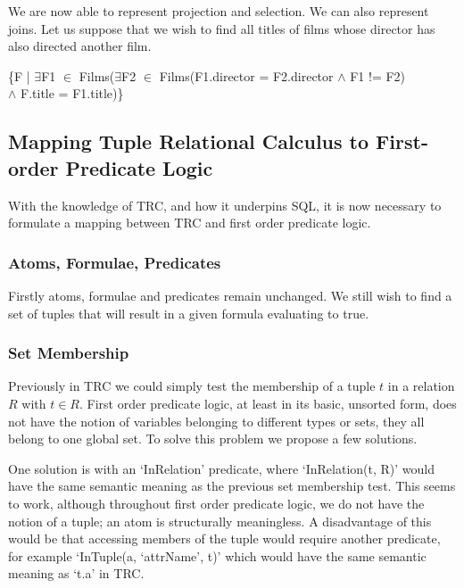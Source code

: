 \documentclass[a4paper, 11pt]{article}
\begin{document}
      We are now able to represent projection and selection. We can also
      represent joins. Let us suppose that we wish to find all titles of films
      whose director has also directed another film.

      \begin{center}
        \{F | $\exists$F1 $\in$ Films($\exists$F2 $\in$ 
        Films(F1.director = F2.director $\land$ F1 != F2)
        \\ $\land$ F.title = F1.title)\}
      \end{center}

\subsection{Mapping Tuple Relational Calculus to First-order Predicate Logic}
    \label{sec:tuplefo}
    With the knowledge of TRC, and how it underpins SQL, it is now necessary to
    formulate a mapping between TRC and first order predicate logic.

    \subsubsection{Atoms, Formulae, Predicates}
      Firstly atoms, formulae and predicates remain unchanged. We still wish to
      find a set of tuples that will result in a given formula evaluating to
      true.

    \subsubsection{Set Membership}
      Previously in TRC we could simply test the membership of a tuple $t$ in a
      relation $R$ with $t \in R$. First order predicate logic, at least in its basic,
      unsorted form, does not have the notion of variables belonging to
      different types or sets, they all belong to one global set. To solve
      this problem we propose a few solutions.

      One solution is with an `InRelation' predicate, where `InRelation(t, R)'
      would have the same semantic meaning as the previous set membership test.
      This seems to work, although throughout first order predicate logic, we
      do not have the notion of a tuple; an atom is structurally meaningless. A
      disadvantage of this would be that accessing members of the tuple would
      require another predicate, for example `InTuple(a, `attrName', t)' which
      would have the same semantic meaning as `t.a' in TRC.
\end{document}
